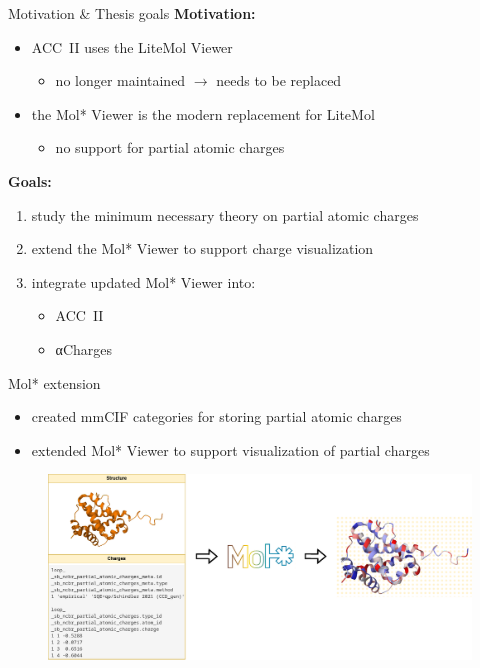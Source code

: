 \documentclass[
]{beamer}
\begin{document}
\begin{frame}{Motivation \& Thesis goals}
  \textbf{Motivation:}
  \begin{itemize}
    \item ACC~II uses the LiteMol Viewer
    \begin{itemize}
      \item no longer maintained $\rightarrow$ needs to be replaced
    \end{itemize}
    \item the Mol* Viewer is the modern replacement for LiteMol
    \begin{itemize}
      \item no support for partial atomic charges
    \end{itemize}
  \end{itemize}
  \vspace{10pt}
  \textbf{Goals:}
  \begin{enumerate}
    \item study the minimum necessary theory on partial atomic charges
    \item extend the Mol* Viewer to support charge visualization
    \item integrate updated Mol* Viewer into:
    \begin{itemize}
      \item ACC~II
      \item αCharges
    \end{itemize}
  \end{enumerate}
\end{frame}
    
\begin{frame}{Mol* extension}
  \begin{itemize}
    \item created mmCIF categories for storing partial atomic charges
    \item extended Mol* Viewer to support visualization of partial charges
  \end{itemize}
  \begin{figure}
    \includegraphics[width=\textwidth,keepaspectratio]{images/molstar-use-case.png}
  \end{figure}
\end{frame}
\end{document}
